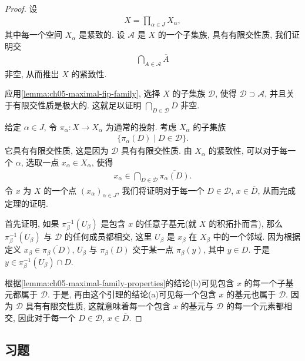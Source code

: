 \documentclass[../../main.tex]{subfiles}
\begin{document}
\begin{proof}
设
\begin{align*}
X=\prod_{\alpha\in J}X_\alpha,
\end{align*}
其中每一个空间 $X_\alpha$ 是紧致的. 设 $\mathcal{A}$ 是 $X$ 的一个子集族, 具有有限交性质, 我们证明交
\begin{align*}
\bigcap_{A\in\mathcal{A}}\overline{A}
\end{align*}
非空, 从而推出 $X$ 的紧致性.

应用\cref{lemma:ch05-maximal-fip-family}, 选择 $X$ 的子集族 $\mathcal{D}$, 使得 $\mathcal{D}\supset\mathcal{A}$, 并且关于有限交性质是极大的. 这就足以证明 $\bigcap_{D\in\mathcal{D}}\overline{D}$ 非空.

给定 $\alpha\in J$, 令 $\pi_\alpha\colon X\to X_\alpha$ 为通常的投射. 考虑 $X_\alpha$ 的子集族
\begin{align*}
\{\pi_\alpha(D)\mid D\in\mathcal{D}\}.
\end{align*}
它具有有限交性质, 这是因为 $\mathcal{D}$ 具有有限交性质. 由 $X_\alpha$ 的紧致性, 可以对于每一个 $\alpha$, 选取一点 $x_\alpha\in X_\alpha$, 使得
\begin{align*}
x_\alpha\in\bigcap_{D\in\mathcal{D}}\overline{\pi_\alpha(D)}.
\end{align*}
令 $x$ 为 $X$ 的一个点 $(x_\alpha)_{\alpha\in J}$, 我们将证明对于每一个 $D\in\mathcal{D}$, $x\in\overline{D}$, 从而完成定理的证明.

首先证明, 如果 $\pi_\beta^{-1}(U_\beta)$ 是包含 $x$ 的任意子基元(就 $X$ 的积拓扑而言), 那么 $\pi_\beta^{-1}(U_\beta)$ 与 $\mathcal{D}$ 的任何成员都相交, 这里 $U_\beta$ 是 $x_\beta$ 在 $X_\beta$ 中的一个邻域. 因为根据定义 $x_\beta\in\overline{\pi_\beta(D)}$, $U_\beta$ 与 $\pi_\beta(D)$ 交于某一点 $\pi_\beta(y)$, 其中 $y\in D$. 于是 $y\in\pi_\beta^{-1}(U_\beta)\cap D$.

根据\cref{lemma:ch05-maximal-family-properties}的结论(b)可见包含 $x$ 的每一个子基元都属于 $\mathcal{D}$. 于是, 再由这个引理的结论(a)可见每一个包含 $x$ 的基元也属于 $\mathcal{D}$. 因为 $\mathcal{D}$ 具有有限交性质, 这就意味着每一个包含 $x$ 的基元与 $\mathcal{D}$ 的每一个元素都相交, 因此对于每一个 $D\in\mathcal{D}$, $x\in\overline{D}$.
\end{proof}

\subsection*{习题}
\end{document}
